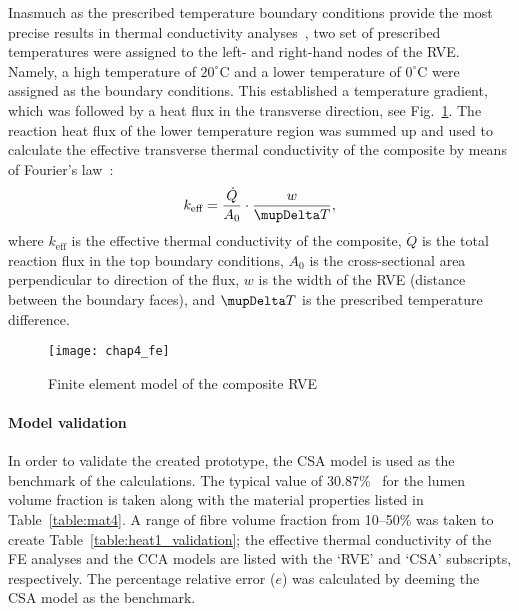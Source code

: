 	Inasmuch as the prescribed temperature boundary conditions provide the most precise results in thermal conductivity analyses~\autocite{Islam.1999}, two set of prescribed temperatures were assigned to the left- and right-hand nodes of the RVE. Namely, a high temperature of $20^\circ\text{C}$ and a lower temperature of $0^\circ\text{C}$ were assigned as the boundary conditions. This established a temperature gradient, which was followed by a heat flux in the transverse direction, see Fig.~\ref{fig:sample}. The reaction heat flux of the lower temperature region was summed up and used to calculate the effective transverse thermal conductivity of the composite by means of Fourier's law~\autocite{Fiedler.2009}:
\begin{equation}
k_{\text{eff}}=\frac{\dot{Q}}{A_0}\cdot\frac{w}{\mupDelta T},
\end{equation}
	where $k_{\text{eff}}$ is the effective thermal conductivity of the composite, $\dot{Q}$ is the total reaction flux in the top boundary conditions, $A_0$ is the cross-sectional area perpendicular to direction of the flux, $w$ is the width of the RVE (distance between the boundary faces), and $\mupDelta T$ is the prescribed temperature difference.
\begin{figure}[t]
\centering
\texttt{[image: chap4\_fe]}
\caption{Finite element model of the composite RVE}\label{fig:sample}
\end{figure}

\red
	\paragraph{Model validation} In order to validate the created prototype, the CSA model is used as the benchmark of the calculations. The typical value of 30.87\%~\autocite{Liu.2011} for the lumen volume fraction is taken along with the material properties listed in Table~\ref{table:mat4}. A range of fibre volume fraction from 10--50\% was taken to create Table~\ref{table:heat1_validation}; the effective thermal conductivity of the FE analyses and the CCA models are listed with the `RVE' and `CSA' subscripts, respectively. The percentage relative error ($e$) was calculated by deeming the CSA model as the benchmark. 


